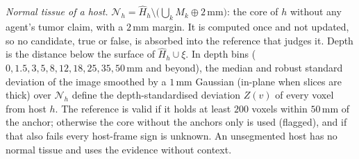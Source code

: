 \documentclass[fleqn,10pt]{olplainarticle}
\begin{document}
\emph{Normal tissue of a host.} $\mathcal{N}_h=\hat H_h\setminus\bigl(\bigcup_k M_k\oplus2\,\mathrm{mm}\bigr)$: the core of
$h$ without any agent's tumor claim, with a $2$\,mm margin. It is computed once and not updated, so no candidate, true or
false, is absorbed into the reference that judges it. Depth is the distance below the surface of $\hat H_h\cup\xi$. In
depth bins ($0,1.5,3,5,8,12,18,25,35,50$\,mm and beyond), the median and robust standard deviation of the image smoothed by
a $1$\,mm Gaussian (in-plane when slices are thick) over $\mathcal{N}_h$ define the depth-standardised deviation $Z(v)$ of
every voxel from host $h$. The reference is valid if it holds at least $200$ voxels within $50$\,mm of the anchor; otherwise
the core without the anchors only is used (flagged), and if that also fails every host-frame sign is unknown. An
unsegmented host has no normal tissue and uses the evidence without context.
\end{document}
